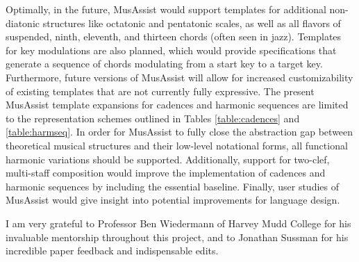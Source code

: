 \documentclass{article}
\begin{document}
Optimally, in the future, MusAssist would support templates for additional non-diatonic structures like octatonic and pentatonic scales, as well as all flavors of suspended, ninth, eleventh, and thirteen chords (often seen in jazz). Templates for key modulations are also planned, which would provide specifications that generate a sequence of chords modulating from a start key to a target key. Furthermore, future versions of MusAssist will allow for increased customizability of existing templates that are not currently fully expressive. The present MusAssist template expansions for cadences and harmonic sequences are limited to the representation schemes outlined in Tables \ref{table:cadences} and \ref{table:harmseq}. In order for MusAssist to fully close the abstraction gap between theoretical musical structures and their low-level notational forms, all functional harmonic variations should be supported. Additionally, support for two-clef, multi-staff composition would improve the implementation of cadences and harmonic sequences by including the essential baseline. Finally, user studies of MusAssist would give insight into potential improvements for language design.

\begin{acknowledgments}
I am very grateful to Professor Ben Wiedermann of Harvey Mudd College for his invaluable mentorship throughout this project, and to Jonathan Sussman for his incredible paper feedback and indispensable edits.
\end{acknowledgments} 


\balance %


\end{document}
